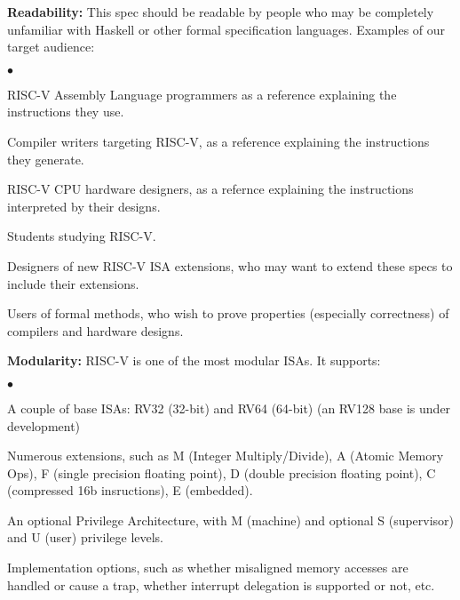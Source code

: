 \documentclass[11pt]{article}
\newenvironment{tightlist}%
{\begin{list}{$\bullet$}{%
    \setlength{\topsep}{0in}
    \setlength{\partopsep}{0in}
    \setlength{\itemsep}{0in}
    \setlength{\parsep}{0in}
    \setlength{\leftmargin}{1.5em}
    \setlength{\rightmargin}{0in}
    \setlength{\itemindent}{0in}
}
}%
{\end{list}
}
\begin{document}
\begin{itemize}

\item {\bf Readability:} This spec should be readable by people who
may be completely unfamiliar with Haskell or other formal
specification languages.  Examples of our target audience:

  \begin{tightlist}
   \item RISC-V Assembly Language programmers as a reference explaining the instructions they use.

   \item Compiler writers targeting RISC-V, as a reference explaining the instructions they generate.

   \item RISC-V CPU hardware designers, as a refernce explaining the instructions interpreted by their designs.

   \item Students studying RISC-V.

   \item Designers of new RISC-V ISA extensions, who may want to
   extend these specs to include their extensions.

   \item Users of formal methods, who wish to prove properties
   (especially correctness) of compilers and hardware designs.

  \end{tightlist}

\item {\bf Modularity:} RISC-V is one of the most modular ISAs.  It
supports:

  \begin{tightlist}
   \item A couple of base ISAs: RV32 (32-bit) and RV64 (64-bit) (an RV128 base is under development)

   \item Numerous extensions, such as M (Integer Multiply/Divide), A
    (Atomic Memory Ops), F (single precision floating point), D
    (double precision floating point), C (compressed 16b insructions), E (embedded).

   \item An optional Privilege Architecture, with M (machine) and
    optional S (supervisor) and U (user) privilege levels.

   \item Implementation options, such as whether misaligned memory
   accesses are handled or cause a trap, whether interrupt delegation
   is supported or not, etc.


\end{tightlist}
\end{itemize}
\end{document}
